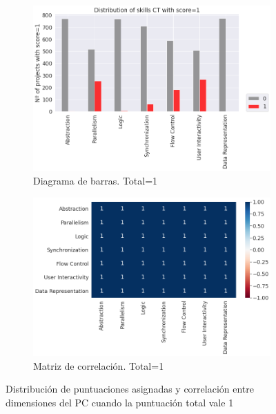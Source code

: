 \documentclass[a4paper, 12pt]{book}
\begin{document}
\begin{figure}
    \centering
    \begin{subfigure}[h]{.49\textwidth} 
        \includegraphics[width=\textwidth]{img/distribucion_1_Scratch}
        \caption{Diagrama de barras. Total=1}
        \label{fig:total1}
    \end{subfigure}       
    \begin{subfigure}[h]{.49\textwidth} 
        \includegraphics[width=\textwidth]{img/corr_1_Scratch}
        \caption{Matriz de correlación. Total=1}
        \label{fig:corr1}
    \end{subfigure}
     \caption{Distribución de puntuaciones asignadas y correlación entre dimensiones del PC cuando la puntuación total vale 1}
\end{figure}
\end{document}
